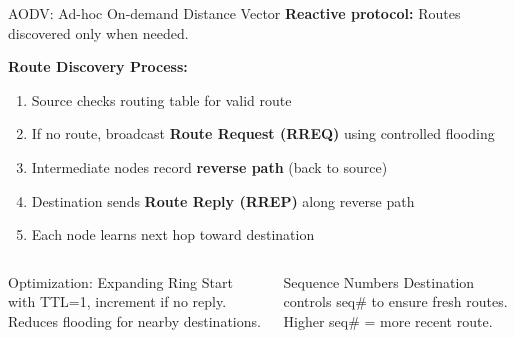 \documentclass[aspectratio=169,11pt]{beamer}
\begin{document}
\begin{frame}{AODV: Ad-hoc On-demand Distance Vector}
    \textbf{Reactive protocol:} Routes discovered only when needed.
    
    \vspace{0.3cm}
    \textbf{Route Discovery Process:}
    \begin{enumerate}
        \item Source checks routing table for valid route
        \item If no route, broadcast \textbf{Route Request (RREQ)} using controlled flooding
        \item Intermediate nodes record \textbf{reverse path} (back to source)
        \item Destination sends \textbf{Route Reply (RREP)} along reverse path
        \item Each node learns next hop toward destination
    \end{enumerate}
    
    \vspace{0.3cm}
    \begin{columns}
        \begin{exampleblock}{Optimization: Expanding Ring}
            Start with TTL=1, increment if no reply. Reduces flooding for nearby destinations.
        \end{exampleblock}
        
        \begin{alertblock}{Sequence Numbers}
            Destination controls seq\# to ensure fresh routes. Higher seq\# = more recent route.
        \end{alertblock}
    \end{columns}
\end{frame}
\end{document}
